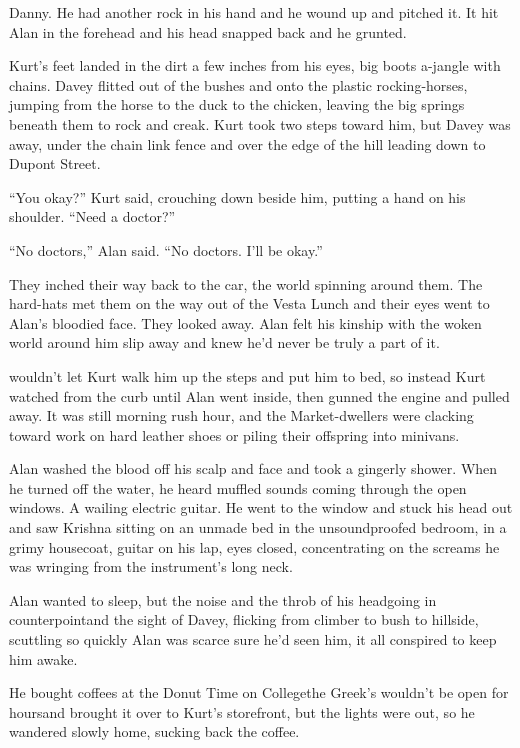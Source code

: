Danny.  He had another rock in his hand and he wound up and pitched
it.  It hit Alan in the forehead and his head snapped back and he
grunted.

Kurt's feet landed in the dirt a few inches from his eyes, big boots
a-jangle with chains.  Davey flitted out of the bushes and onto the
plastic rocking-horses, jumping from the horse to the duck to the
chicken, leaving the big springs beneath them to rock and creak.  Kurt
took two steps toward him, but Davey was away, under the chain link
fence and over the edge of the hill leading down to Dupont Street.

``You okay?'' Kurt said, crouching down beside him, putting a hand on
his shoulder.  ``Need a doctor?''

``No doctors,'' Alan said.  ``No doctors.  I'll be okay.''

They inched their way back to the car, the world spinning around them. 
The hard-hats met them on the way out of the Vesta Lunch and their
eyes went to Alan's bloodied face.  They looked away.  Alan felt his
kinship with the woken world around him slip away and knew he'd never
be truly a part of it.

 wouldn't let Kurt walk him up the steps and put him to bed, so
instead Kurt watched from the curb until Alan went inside, then gunned
the engine and pulled away.  It was still morning rush hour, and the
Market-dwellers were clacking toward work on hard leather shoes or
piling their offspring into minivans.

Alan washed the blood off his scalp and face and took a gingerly
shower.  When he turned off the water, he heard muffled sounds coming
through the open windows.  A wailing electric guitar.  He went to the
window and stuck his head out and saw Krishna sitting on an unmade bed
in the unsoundproofed bedroom, in a grimy housecoat, guitar on his
lap, eyes closed, concentrating on the screams he was wringing from
the instrument's long neck.

Alan wanted to sleep, but the noise and the throb of his head\dash{}going
in counterpoint\dash{}and the sight of Davey, flicking from climber to
bush to hillside, scuttling so quickly Alan was scarce sure he'd seen
him, it all conspired to keep him awake.

He bought coffees at the Donut Time on College\dash{}the Greek's wouldn't
be open for hours\dash{}and brought it over to Kurt's storefront, but the
lights were out, so he wandered slowly home, sucking back the coffee.

